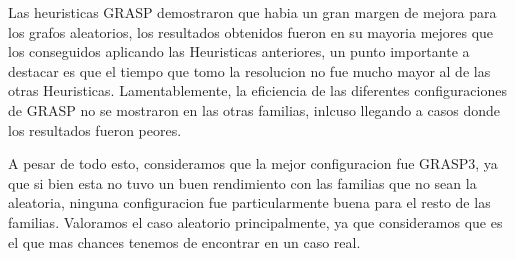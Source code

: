 Las heuristicas GRASP demostraron que habia un gran margen de mejora para los grafos aleatorios, los resultados obtenidos fueron en su mayoria mejores que los conseguidos aplicando las Heuristicas anteriores, un punto importante a destacar es que el tiempo que tomo la resolucion no fue mucho mayor al de las otras Heuristicas. Lamentablemente, la eficiencia de las diferentes configuraciones de GRASP no se mostraron en las otras familias, inlcuso llegando a casos donde los resultados fueron peores.

A pesar de todo esto, consideramos que la mejor configuracion fue GRASP3, ya que si bien esta no tuvo un buen rendimiento con las familias que no sean la aleatoria, ninguna configuracion fue particularmente buena para el resto de las familias. Valoramos el caso aleatorio principalmente, ya que consideramos que es el que mas chances tenemos de encontrar en un caso real.